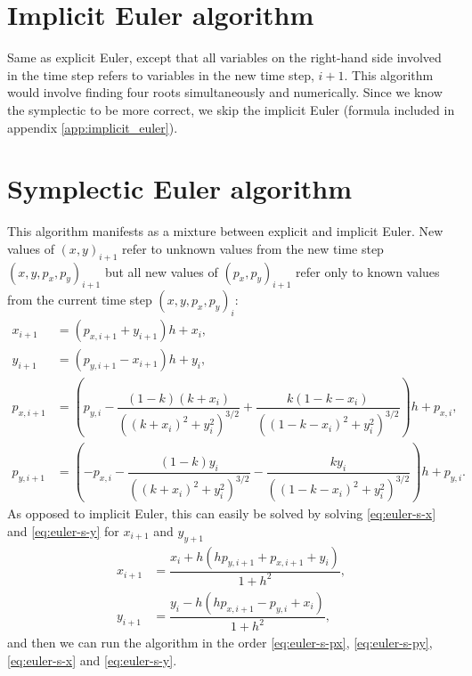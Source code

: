 \section{Implicit Euler algorithm}
Same as explicit Euler, except that all variables on the right-hand side involved in the time step refers to variables in the new time step, $i+1$. This algorithm would involve finding four roots simultaneously and numerically. Since we know the symplectic to be more correct, we skip the implicit Euler (formula included in appendix \ref{app:implicit_euler}).

\section{Symplectic Euler algorithm}
This algorithm manifests as a mixture between explicit and implicit Euler. New values of $(x,y)_{i+1}$ refer to unknown values from the new time step $(x,y,p_x,p_y)_{i+1}$ but all new values of $(p_x,p_y)_{i+1}$ refer only to known values from the current time step $(x,y,p_x,p_y)_i$:
\begin{align}
x_{i+1} &= (p_{x,i+1} + y_{i+1})h + x_i \label{eq:euler-s-x}, \\[0.2cm]
y_{i+1} &= (p_{y,i+1} - x_{i+1})h + y_i \label{eq:euler-s-y}, \\[0.2cm]
p_{x,i+1} &= \left(p_{y,i} - \dfrac{(1-k)(k+x_i)}{((k+x_i)^2+y_i^2)^{3/2}} + \dfrac{k(1-k-x_i)}{((1-k-x_i)^2+y_i^2)^{3/2}}\right)h + p_{x,i} \label{eq:euler-s-px}, \\[0.2cm]
p_{y,i+1} &= \left(-p_{x,i} - \dfrac{(1-k)y_i}{((k+x_i)^2+y_i^2)^{3/2}} - \dfrac{k y_i}{((1-k-x_i)^2+y_i^2)^{3/2}}\right)h + p_{y,i}. \label{eq:euler-s-py}
\end{align}
As opposed to implicit Euler, this can easily be solved by solving \eqref{eq:euler-s-x} and \eqref{eq:euler-s-y} for $x_{i+1}$ and $y_{y+1}$
\begin{align}
x_{i+1} &= \dfrac{x_i + h(h p_{y,i+1} + p_{x,i+1} + y_i)}{1+h^2}, \label{eq:euler_s_x2} \\[0.5cm]
y_{i+1} &= \dfrac{y_i - h(h p_{x,i+1} - p_{y,i} + x_i)}{1+h^2}, \label{eq:euler_s_y2}
\end{align}
and then we can run the algorithm in the order \eqref{eq:euler-s-px}, \eqref{eq:euler-s-py}, \eqref{eq:euler-s-x} and \eqref{eq:euler-s-y}.

